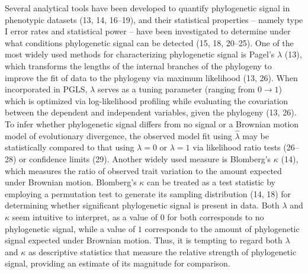 \documentclass[9pt,twocolumn,twoside,lineno]{pnas-new}
\begin{document}
Several analytical tools have been developed to quantify phylogenetic
signal in phenotypic datasets (13, 14, 16--19), and their statistical
properties -- namely type I error rates and statistical power -- have
been investigated to determine under what conditions phylogenetic signal
can be detected (15, 18, 20--25). One of the most widely used methods
for characterizing phylogenetic signal is Pagel's \(\lambda\) (13),
which transforms the lengths of the internal branches of the phylogeny
to improve the fit of data to the phylogeny via maximum likelihood (13,
26). When incorporated in PGLS, \(\lambda\) serves as a tuning parameter
(ranging from \(0\rightarrow1\)) which is optimized via log-likelihood
profiling while evaluating the covariation between the dependent and
independent variables, given the phylogeny (13, 26). To infer whether
phylogenetic signal differs from no signal or a Brownian motion model of
evolutionary divergence, the observed model fit using \(\hat\lambda\)
may be statistically compared to that using \(\lambda=0\) or
\(\lambda=1\) via likelihood ratio tests (26--28) or confidence limits
(29). Another widely used measure is Blomberg's \(\kappa\) (14), which
measures the ratio of observed trait variation to the amount expected
under Brownian motion. Blomberg's \(\kappa\) can be treated as a test
statistic by employing a permutation test to generate its sampling
distribution (14, 18) for determining whether significant phylogenetic
signal is present in data. Both \(\lambda\) and \(\kappa\) seem
intuitive to interpret, as a value of \(0\) for both corresponds to no
phylogenetic signal, while a value of \(1\) corresponds to the amount of
phylogenetic signal expected under Brownian motion. Thus, it is tempting
to regard both \(\lambda\) and \(\kappa\) as descriptive statistics that
measure the relative strength of phylogenetic signal, providing an
estimate of its magnitude for comparison.
\end{document}
